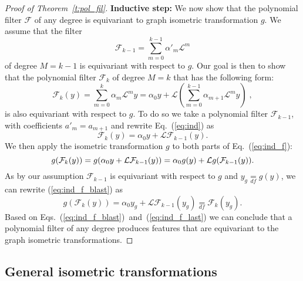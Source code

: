 \documentclass[10pt,journal,compsoc]{IEEEtran}
\newcommand{\df}{\mathop{=}\limits_{df}}
\newcommand{\mF}{\mathcal{F}}
\begin{document}
\begin{proof}[Proof of Theorem~\ref{t:pol_fil}]
		\textbf{Inductive step: } We now show that the polynomial filter $\mathcal{F}$ of any degree is equivariant to graph isometric transformation $g$. We assume that the filter 
		\begin{equation}
		\mathcal{F}_{k-1}=\sum_{m=0}^{k-1} \alpha'_m \mathcal{L}^m
		\end{equation} 
		\noindent
		of degree $M = k-1$ is equivariant with respect to $g$. Our goal is then to show that the polynomial filter $\mathcal{F}_k$ of degree $M = k$ that has the following form:
		\begin{equation}
		\mathcal{F}_{k}(y) = \sum\limits_{m=0}^{k} \alpha_m \mathcal{L}^m y =
		\alpha_0 y + \mathcal{L} \left(\sum\limits_{m=0}^{k-1} \alpha_{m+1} \mathcal{L}^{m} y \right) \;,
		\label{eq:ind}
		\end{equation} 
		\noindent
		is also equivariant with respect to $g$.
		To do so we take a polynomial filter $\mF_{k-1}$, with coefficients $a'_m = a_{m+1}$  and rewrite Eq.~(\ref{eq:ind}) as 
		\begin{equation}
		\mathcal{F}_{k}(y) = \alpha_0 y + \mathcal{L} \mathcal{F}_{k-1}(y).
		\label{eq:ind_f}
		\end{equation} 
		\noindent
We then apply the isometric transformation $g$ to both parts of Eq.~(\ref{eq:ind_f}):
		\begin{equation}
		\small
		g(\mathcal{F}_{k}(y)) = g(\alpha_0 y + \mathcal{L} \mathcal{F}_{k-1}(y)) = \alpha_0 g(y) + \mathcal{L} g(\mathcal{F}_{k-1}(y)).
		\label{eq:ind_f_blast}
		\end{equation} 
		\noindent
As by our assumption $\mathcal{F}_{k-1}$ is equivariant with respect to $g$ and $y_g \df g(y)$, we can rewrite (\ref{eq:ind_f_blast}) as
		\begin{equation}
		g(\mathcal{F}_{k}(y)) = \alpha_0 y_g + \mathcal{L} \mathcal{F}_{k-1}(y_g) \df \mathcal{F}_{k}(y_g).
		\label{eq:ind_f_last}
		\end{equation} 
		\noindent
Based on Eqs.~(\ref{eq:ind_f_blast})~and~(\ref{eq:ind_f_last}) we can conclude that a polynomial filter of any degree produces features  that are equivariant  to the graph isometric transformations.
		
	\end{proof}
	
	
	\subsection{General isometric transformations}
	\label{s:git}
	
\end{document}
